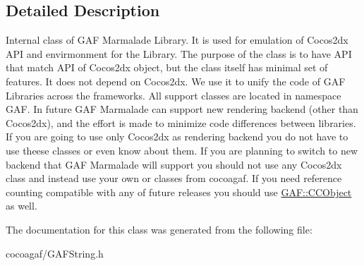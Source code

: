 \subsection{Detailed Description}
Internal class of G\-A\-F Marmalade Library. It is used for emulation of Cocos2dx A\-P\-I and envirmonment for the Library. The purpose of the class is to have A\-P\-I that match A\-P\-I of Cocos2dx object, but the class itself has minimal set of features. It does not depend on Cocos2dx. We use it to unify the code of G\-A\-F Libraries across the frameworks. All support classes are located in namespace G\-A\-F. In future G\-A\-F Marmalade can support new rendering backend (other than Cocos2dx), and the effort is made to minimize code differences between libraries. If you are going to use only Cocos2dx as rendering backend you do not have to use theese classes or even know about them. If you are planning to switch to new backend that G\-A\-F Marmalade will support you should not use any Cocos2dx class and instead use your own or classes from cocoagaf. If you need reference counting compatible with any of future releases you should use \hyperlink{class_g_a_f_1_1_c_c_object}{G\-A\-F\-::\-C\-C\-Object} as well. 

The documentation for this class was generated from the following file\-:\begin{DoxyCompactItemize}
\item 
cocoagaf/G\-A\-F\-String.\-h\end{DoxyCompactItemize}
